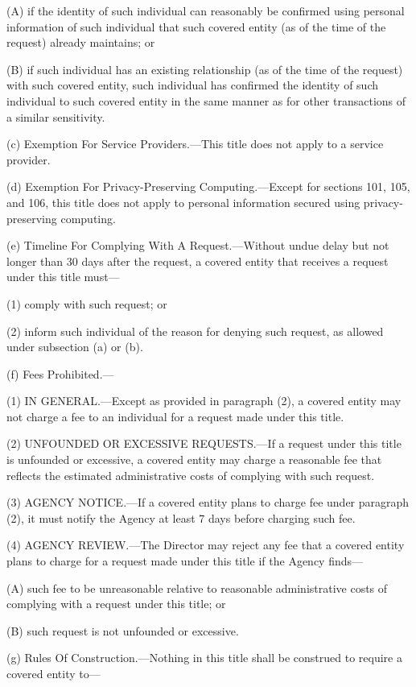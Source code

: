 (A) if the identity of such individual can reasonably be confirmed using personal information of such individual that such covered entity (as of the time of the request) already maintains; or

(B) if such individual has an existing relationship (as of the time of the request) with such covered entity, such individual has confirmed the identity of such individual to such covered entity in the same manner as for other transactions of a similar sensitivity.

(c) Exemption For Service Providers.—This title does not apply to a service provider.

(d) Exemption For Privacy-Preserving Computing.—Except for sections 101, 105, and 106, this title does not apply to personal information secured using privacy-preserving computing.

(e) Timeline For Complying With A Request.—Without undue delay but not longer than 30 days after the request, a covered entity that receives a request under this title must—

(1) comply with such request; or

(2) inform such individual of the reason for denying such request, as allowed under subsection (a) or (b).

(f) Fees Prohibited.—

(1) IN GENERAL.—Except as provided in paragraph (2), a covered entity may not charge a fee to an individual for a request made under this title.

(2) UNFOUNDED OR EXCESSIVE REQUESTS.—If a request under this title is unfounded or excessive, a covered entity may charge a reasonable fee that reflects the estimated administrative costs of complying with such request.

(3) AGENCY NOTICE.—If a covered entity plans to charge fee under paragraph (2), it must notify the Agency at least 7 days before charging such fee.

(4) AGENCY REVIEW.—The Director may reject any fee that a covered entity plans to charge for a request made under this title if the Agency finds—

(A) such fee to be unreasonable relative to reasonable administrative costs of complying with a request under this title; or

(B) such request is not unfounded or excessive.

(g) Rules Of Construction.—Nothing in this title shall be construed to require a covered entity to—


